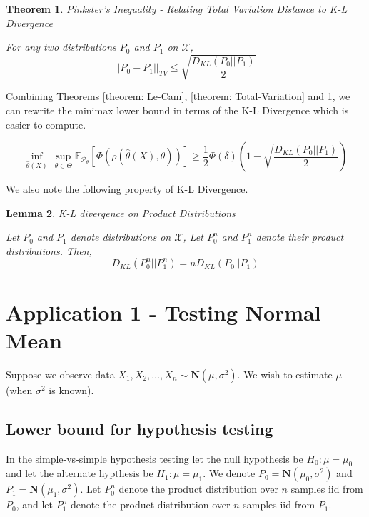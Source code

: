 \documentclass{article}
\newcommand{\Pd}{\mathcal{P}}
\newcommand{\Ev}{\mathbb{E}}
\newtheorem{theorem}{Theorem}
\newtheorem{lemma}[theorem]{Lemma}
\begin{document}
	
	\begin{theorem}{Pinkster's Inequality - Relating Total Variation Distance to K-L Divergence}
		
		\label{theorem: Pinkster}
		For any two distributions $P_0$ and $P_1$ on $\mathcal{X}$,
		\[
		||P_0-P_1||_{TV} \leq \sqrt{\frac{D_{KL}(P_0 || P_1)}{2}} 
		\]
	\end{theorem}
	
	Combining Theorems \ref{theorem: Le-Cam}, \ref{theorem: Total-Variation} and \ref{theorem: Pinkster}, we can rewrite the minimax lower bound in terms of the K-L Divergence which is easier to compute. 
	
	\begin{equation}
	\label{equation: LowerBound-Divergence}
	\inf_{\hat\theta(X)} \, \sup_{\theta \in \Theta} \Ev_{\Pd_\theta} \left[ \Phi(\rho(\hat\theta(X),\theta))\right] \geq \frac{1}{2}\Phi(\delta) \left( 1 -  \sqrt{\frac{D_{KL}(P_0 || P_1)}{2}} \right)
	\end{equation}
	
	We also note the following property of K-L Divergence. 
	
	\begin{lemma}{K-L divergence on Product Distributions}
		
		\label{lemma: KLProduct}	
		Let $P_0$ and $P_1$ denote distributions on $\mathcal{X}$, Let $P_0^n$ and $P_1^n$ denote their product distributions. Then, 
		\[
		D_{KL}(P_0^n || P_1^n) = nD_{KL}(P_0 || P_1)  
		\]	
	\end{lemma}
	
	\section{Application 1 - Testing Normal Mean}
	Suppose we observe data 
	$X_1, X_2,\ldots, X_n \sim \mathbf{N}(\mu, \sigma^2)$. We wish to estimate $\mu$ 
	(when $\sigma^2$ is known).
	
	\subsection{Lower bound for hypothesis testing}
	In the simple-vs-simple hypothesis testing let the null hypothesis be $H_0 : \mu = \mu_0$ and let the alternate hypthesis be $H_1 : \mu = \mu_1$. We denote $P_0 = \mathbf{N}(\mu_0,\sigma^2)$ and $P_1 = \mathbf{N}(\mu_1,\sigma^2)$. Let $P_0^n$ denote the product distribution over $n$ samples iid from $P_0$, and let $P_1^n$ denote the product distribution over $n$ samples iid from $P_1$.
	
\end{document}
